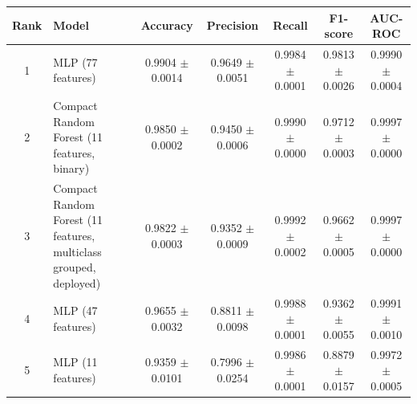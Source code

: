 \begin{tabular}{clccccc}
\toprule
\textbf{Rank} & \textbf{Model} & \textbf{Accuracy} & \textbf{Precision} & \textbf{Recall} & \textbf{F1-score} & \textbf{AUC-ROC}\\
\midrule
1 & MLP (77 features) & 0.9904 $\pm$ 0.0014 & 0.9649 $\pm$ 0.0051 & 0.9984 $\pm$ 0.0001 & 0.9813 $\pm$ 0.0026 & 0.9990 $\pm$ 0.0004\\
2 & Compact Random Forest (11 features, binary) & 0.9850 $\pm$ 0.0002 & 0.9450 $\pm$ 0.0006 & 0.9990 $\pm$ 0.0000 & 0.9712 $\pm$ 0.0003 & 0.9997 $\pm$ 0.0000\\
3 & Compact Random Forest (11 features, multiclass grouped, deployed) & 0.9822 $\pm$ 0.0003 & 0.9352 $\pm$ 0.0009 & 0.9992 $\pm$ 0.0002 & 0.9662 $\pm$ 0.0005 & 0.9997 $\pm$ 0.0000\\
4 & MLP (47 features) & 0.9655 $\pm$ 0.0032 & 0.8811 $\pm$ 0.0098 & 0.9988 $\pm$ 0.0001 & 0.9362 $\pm$ 0.0055 & 0.9991 $\pm$ 0.0010\\
5 & MLP (11 features) & 0.9359 $\pm$ 0.0101 & 0.7996 $\pm$ 0.0254 & 0.9986 $\pm$ 0.0001 & 0.8879 $\pm$ 0.0157 & 0.9972 $\pm$ 0.0005\\
\bottomrule
\end{tabular}
